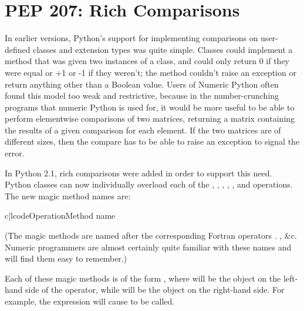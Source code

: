 \documentclass{howto}
\begin{document}
\begin{seealso}


\end{seealso}

\section{PEP 207: Rich Comparisons}

In earlier versions, Python's support for implementing comparisons on
user-defined classes and extension types was quite simple. Classes
could implement a  method that was given two instances
of a class, and could only return 0 if they were equal or +1 or -1 if
they weren't; the method couldn't raise an exception or return
anything other than a Boolean value.  Users of Numeric Python often
found this model too weak and restrictive, because in the
number-crunching programs that numeric Python is used for, it would be
more useful to be able to perform elementwise comparisons of two
matrices, returning a matrix containing the results of a given
comparison for each element.  If the two matrices are of different
sizes, then the compare has to be able to raise an exception to signal
the error.

In Python 2.1, rich comparisons were added in order to support this
need.  Python classes can now individually overload each of the
\code{<}, \code{<=}, \code{>}, \code{>=}, \code{==}, and \code{!=}
operations.  The new magic method names are:

\begin{tableii}{c|l}{code}{Operation}{Method name}
   
   
   
  \end{tableii}

(The magic methods are named after the corresponding Fortran operators
. , \&c.  Numeric programmers are almost
certainly quite familiar with these names and will find them easy to
remember.)
 
Each of these magic methods is of the form , where  will be the object on the left-hand side of
the operator, while  will be the object on the right-hand
side.  For example, the expression  will cause
 to be called.
\end{document}
